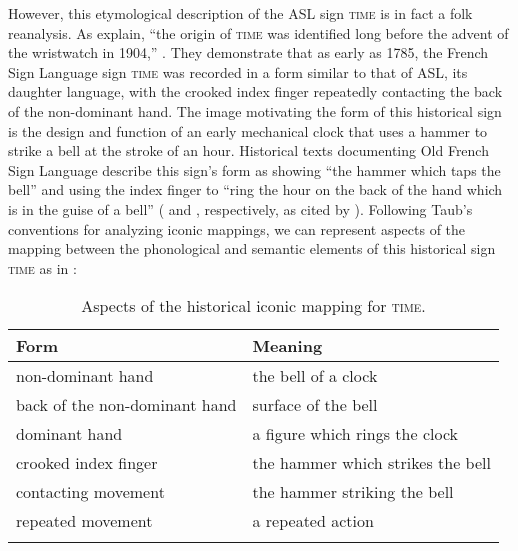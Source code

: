 \documentclass[output=paper,
modfonts
]{LSP/langsci}
\begin{document}
  However, this etymological description of the ASL sign \textsc{time} is in fact a folk reanalysis. As \citet{Shaw2010} explain, ``the origin of \textsc{time} was identified long before the advent of the wristwatch in 1904,'' \citep[177]{Shaw2010}. They demonstrate that as early as 1785, the French Sign Language sign \textsc{time} was recorded in a form similar to that of ASL, its daughter language, with the crooked index finger repeatedly contacting the back of the non-dominant hand. The image motivating the form of this historical sign is the design and function of an early mechanical clock that uses a hammer to strike a bell at the stroke of an hour. Historical texts documenting Old French Sign Language describe this sign's form as showing ``the hammer which taps the bell'' and using the index finger to ``ring the hour on the back of the hand which is in the guise of a bell'' (\citealt{Ferrand1785} and \citealt{Lambert1865}, respectively, as cited by \citealt[177-178]{Shaw2010}). Following Taub's \citeyearpar{Taub2001} conventions for analyzing iconic mappings, we can represent aspects of the mapping between the phonological and semantic elements of this historical sign \textsc{time} as in :

\begin{table}
\caption{Aspects of the historical iconic mapping for \textsc{time}.}
\label{tab:3}
\begin{tabular}{ll}
\lsptoprule
Form & Meaning\\
\midrule
non-dominant hand & the bell of a clock\\

back of the non-dominant hand & surface of the bell\\

dominant hand & a figure which rings the clock\\

crooked index finger & the hammer which strikes the bell\\

contacting movement & the hammer striking the bell\\

repeated movement & a repeated action\\
\lspbottomrule
\end{tabular}
\end{table}
\end{document}
